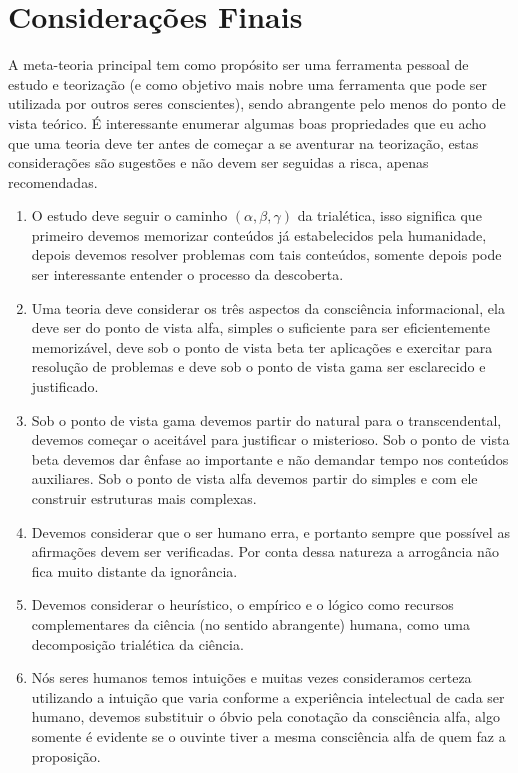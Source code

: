 \documentclass[10pt,a4paper]{report}
\begin{document}
\chapter{Considerações Finais}

\hspace{\baselineskip}

A meta-teoria principal tem como propósito ser uma ferramenta pessoal de estudo e teorização (e como objetivo mais nobre uma ferramenta que pode ser utilizada por outros seres conscientes), sendo abrangente pelo menos do ponto de vista teórico. É interessante enumerar algumas boas propriedades que eu acho que uma teoria deve ter antes de começar a se aventurar na teorização, estas considerações são sugestões e não devem ser seguidas a risca, apenas recomendadas.

\begin{enumerate}
	\item O estudo deve seguir o caminho $(\alpha, \beta, \gamma)$ da trialética, isso significa que primeiro devemos memorizar conteúdos já estabelecidos pela humanidade, depois devemos resolver problemas com tais conteúdos, somente depois pode ser interessante entender o processo da descoberta.
	\item Uma teoria deve considerar os três aspectos da consciência informacional, ela deve ser do ponto de vista alfa, simples o suficiente para ser eficientemente memorizável, deve sob o ponto de vista beta ter aplicações e exercitar para resolução de problemas e deve sob o ponto de vista gama ser esclarecido e justificado.
	\item Sob o ponto de vista gama devemos partir do natural para o transcendental, devemos começar o aceitável para justificar o misterioso. Sob o ponto de vista beta devemos dar ênfase ao importante e não demandar tempo nos conteúdos auxiliares. Sob o ponto de vista alfa devemos partir do simples e com ele construir estruturas mais complexas.
	\item Devemos considerar que o ser humano erra, e portanto sempre que possível as afirmações devem ser verificadas. Por conta dessa natureza a arrogância não fica muito distante da ignorância.
	\item Devemos considerar o heurístico, o empírico e o lógico como recursos complementares da ciência (no sentido abrangente) humana, como uma decomposição trialética da ciência.
	\item Nós seres humanos temos intuições e muitas vezes consideramos certeza utilizando a intuição que varia conforme a experiência intelectual de cada ser humano, devemos substituir o óbvio pela conotação da consciência alfa, algo somente é evidente se o ouvinte tiver a mesma consciência alfa de quem faz a proposição.

\end{enumerate}
\end{document}
